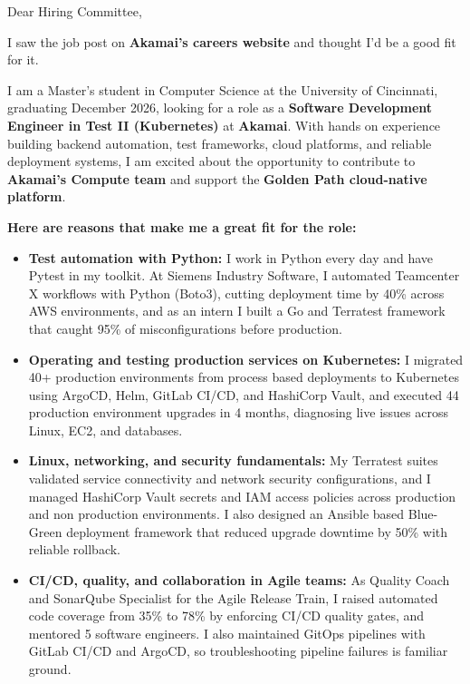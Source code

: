 \documentclass[11pt]{letter}
\date{}
\begin{document}
\begin{letter}{}

\opening{Dear Hiring Committee,}

I saw the job post on \textbf{Akamai's careers website} and thought I'd be a good fit for it.

I am a Master's student in Computer Science at the University of Cincinnati, graduating December 2026, looking for a role as a \textbf{Software Development Engineer in Test II (Kubernetes)} at \textbf{Akamai}. With hands on experience building backend automation, test frameworks, cloud platforms, and reliable deployment systems, I am excited about the opportunity to contribute to \textbf{Akamai's Compute team} and support the \textbf{Golden Path cloud-native platform}.

\textbf{Here are reasons that make me a great fit for the role:}

\begin{itemize}[leftmargin=*, itemsep=0.45em]
    \item \textbf{Test automation with Python:} I work in Python every day and have Pytest in my toolkit. At Siemens Industry Software, I automated Teamcenter X workflows with Python (Boto3), cutting deployment time by 40\% across AWS environments, and as an intern I built a Go and Terratest framework that caught 95\% of misconfigurations before production.

    \item \textbf{Operating and testing production services on Kubernetes:} I migrated 40+ production environments from process based deployments to Kubernetes using ArgoCD, Helm, GitLab CI/CD, and HashiCorp Vault, and executed 44 production environment upgrades in 4 months, diagnosing live issues across Linux, EC2, and databases.

    \item \textbf{Linux, networking, and security fundamentals:} My Terratest suites validated service connectivity and network security configurations, and I managed HashiCorp Vault secrets and IAM access policies across production and non production environments. I also designed an Ansible based Blue-Green deployment framework that reduced upgrade downtime by 50\% with reliable rollback.

    \item \textbf{CI/CD, quality, and collaboration in Agile teams:} As Quality Coach and SonarQube Specialist for the Agile Release Train, I raised automated code coverage from 35\% to 78\% by enforcing CI/CD quality gates, and mentored 5 software engineers. I also maintained GitOps pipelines with GitLab CI/CD and ArgoCD, so troubleshooting pipeline failures is familiar ground.
\end{itemize}


\end{letter}
\end{document}
